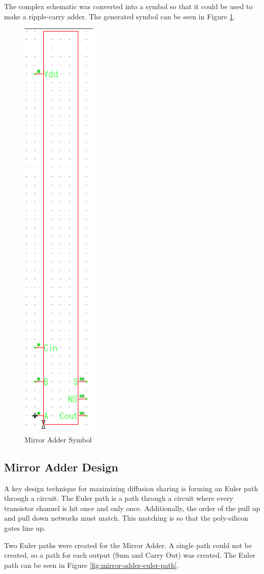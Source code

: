 \documentclass[11pt]{article}
\begin{document}
	The complex schematic was converted into a symbol so that it could be used to make a ripple-carry adder. The generated symbol can be seen in Figure \ref{fig:mirroradder-symbol}.
	
	\begin{figure}[H]
		\centering
		\includegraphics[width=0.2\linewidth]{"Pictures/MirrorAdder Symbol"}
		\caption{Mirror Adder Symbol}
		\label{fig:mirroradder-symbol}
	\end{figure}

	\subsection{Mirror Adder Design}
	
		A key design technique for maximizing diffusion sharing is forming an Euler path through a circuit. The Euler path is a path through a circuit where every transistor channel is hit once and only once. Additionally, the order of the pull up and pull down networks must match. This matching is so that the poly-silicon gates line up. 
		
		
		Two Euler paths were created for the Mirror Adder. A single path could not be created, so a path for each output (Sum and Carry Out) was created. The Euler path can be seen in Figure \ref{fig:mirror-adder-euler-path}.
\end{document}
